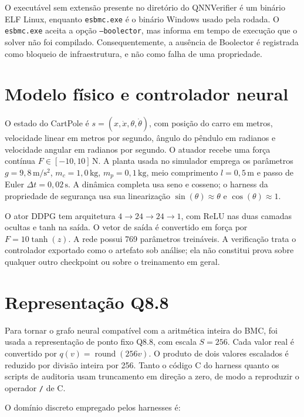 O executável sem extensão presente no diretório do QNNVerifier é um binário ELF
Linux, enquanto \texttt{esbmc.exe} é o binário Windows usado pela rodada. O
\texttt{esbmc.exe} aceita a opção \texttt{--boolector}, mas informa em tempo de
execução que o solver não foi compilado. Consequentemente, a ausência de
Boolector é registrada como bloqueio de infraestrutura, e não como falha de uma
propriedade.

\section{Modelo físico e controlador neural}

O estado do CartPole é
\(s=(x,\dot{x},\theta,\dot{\theta})\), com posição do carro em metros,
velocidade linear em metros por segundo, ângulo do pêndulo em radianos e
velocidade angular em radianos por segundo. O atuador recebe uma força contínua
\(F\in[-10,10]\,\mathrm{N}\). A planta usada no simulador emprega os parâmetros
\(g=9{,}8\,\mathrm{m/s^2}\), \(m_c=1{,}0\,\mathrm{kg}\),
\(m_p=0{,}1\,\mathrm{kg}\), meio comprimento \(l=0{,}5\,\mathrm{m}\) e passo de
Euler \(\Delta t=0{,}02\,\mathrm{s}\). A dinâmica completa usa seno e cosseno;
o harness da propriedade de segurança usa sua linearização
\(\sin(\theta)\approx\theta\) e \(\cos(\theta)\approx1\).

O ator DDPG tem arquitetura \(4\mathbin{\to}24\mathbin{\to}24\mathbin{\to}1\),
com ReLU nas duas camadas ocultas e tanh na saída. O vetor de saída é convertido
em força por \(F=10\tanh(z)\). A rede possui 769 parâmetros treináveis. A
verificação trata o controlador exportado como o artefato sob análise; ela não
constitui prova sobre qualquer outro checkpoint ou sobre o treinamento em
geral.

\section{Representação Q8.8}

Para tornar o grafo neural compatível com a aritmética inteira do BMC, foi usada
a representação de ponto fixo Q8.8, com escala \(S=256\). Cada valor real é
convertido por \(q(v)=\operatorname{round}(256v)\). O produto de dois valores
escalados é reduzido por divisão inteira por 256. Tanto o código C do harness
quanto os scripts de auditoria usam truncamento em direção a zero, de modo a
reproduzir o operador \texttt{/} de C.

O domínio discreto empregado pelos harnesses é:

